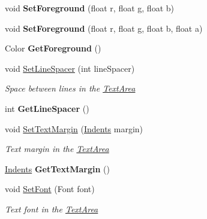 \begin{DoxyCompactItemize}
void {\bfseries Set\+Foreground} (float r, float g, float b)
\item 
\mbox{\label{class_space_v_i_l_1_1_text_area_ab3321ee3e9c39b2e707739508dde8351}} 
void {\bfseries Set\+Foreground} (float r, float g, float b, float a)
\item 
\mbox{\label{class_space_v_i_l_1_1_text_area_ac2873e2c8712e4658655a4315df651e6}} 
Color {\bfseries Get\+Foreground} ()
\item 
void \mbox{\hyperlink{class_space_v_i_l_1_1_text_area_a133db6e0dc1fccf3e92d4044d9a16df0}{Set\+Line\+Spacer}} (int line\+Spacer)
\begin{DoxyCompactList}\small\item\em Space between lines in the \mbox{\hyperlink{class_space_v_i_l_1_1_text_area}{Text\+Area}} \end{DoxyCompactList}\item 
\mbox{\label{class_space_v_i_l_1_1_text_area_aab5aac2095c6cd6f79d3bde258900bff}} 
int {\bfseries Get\+Line\+Spacer} ()
\item 
void \mbox{\hyperlink{class_space_v_i_l_1_1_text_area_a4c109ddb93c025558a90184754f59de8}{Set\+Text\+Margin}} (\mbox{\hyperlink{struct_space_v_i_l_1_1_decorations_1_1_indents}{Indents}} margin)
\begin{DoxyCompactList}\small\item\em Text margin in the \mbox{\hyperlink{class_space_v_i_l_1_1_text_area}{Text\+Area}} \end{DoxyCompactList}\item 
\mbox{\label{class_space_v_i_l_1_1_text_area_a5a773ffecd327e91ffb821a6780cef82}} 
\mbox{\hyperlink{struct_space_v_i_l_1_1_decorations_1_1_indents}{Indents}} {\bfseries Get\+Text\+Margin} ()
\item 
void \mbox{\hyperlink{class_space_v_i_l_1_1_text_area_ae36fe1442f5315790b8c3a4f2b33287c}{Set\+Font}} (Font font)
\begin{DoxyCompactList}\small\item\em Text font in the \mbox{\hyperlink{class_space_v_i_l_1_1_text_area}{Text\+Area}} \end{DoxyCompactList}\item 
\mbox{\label{class_space_v_i_l_1_1_text_area_aad5e5b0d5f982225a69db1c5397685d2}} 

\end{DoxyCompactItemize}
